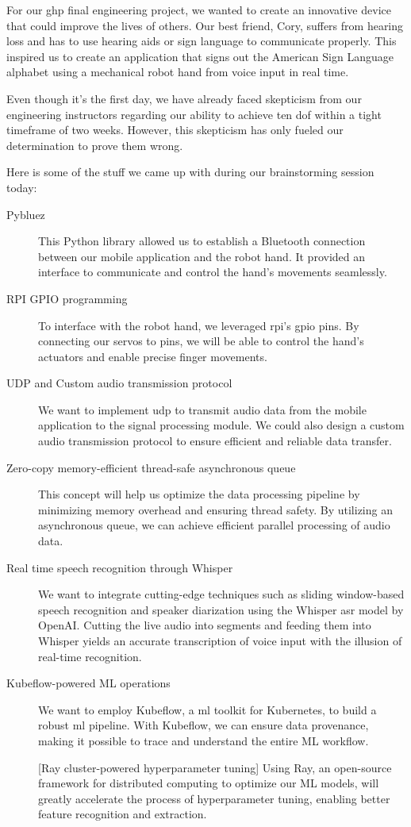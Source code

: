 
For our \gls{ghp} final engineering project, we wanted to create an innovative device that could improve the lives of others. Our best friend, Cory, suffers from hearing loss and has to use hearing aids or sign language to communicate properly. This inspired us to create an application that signs out the American Sign Language alphabet using a mechanical robot hand from voice input in real time.

Even though it's the first day, we have already faced skepticism from our engineering instructors regarding our ability to achieve ten \gls{dof} within a tight timeframe of two weeks. However, this skepticism has only fueled our determination to prove them wrong.

Here is some of the stuff we came up with during our brainstorming session today:
\begin{description}
\item[Pybluez] This Python library allowed us to establish a Bluetooth connection between our mobile application and the robot hand. It provided an interface to communicate and control the hand's movements seamlessly.

\item[RPI GPIO programming] To interface with the robot hand, we leveraged \gls{rpi}'s \gls{gpio} pins. By connecting our servos to pins, we will be able to control the hand's actuators and enable precise finger movements.

\item[UDP and Custom audio transmission protocol] We want to implement \gls{udp} to transmit audio data from the mobile application to the signal processing module. We could also design a custom audio transmission protocol to ensure efficient and reliable data transfer.

\item[Zero-copy memory-efficient thread-safe asynchronous queue] This concept will help us optimize the data processing pipeline by minimizing memory overhead and ensuring thread safety. By utilizing an asynchronous queue, we can achieve efficient parallel processing of audio data.

\item[Real time speech recognition through Whisper] We want to integrate cutting-edge techniques such as sliding window-based speech recognition and speaker diarization using the Whisper \gls{asr} model by OpenAI. Cutting the live audio into segments and feeding them into Whisper yields an accurate transcription of voice input with the illusion of real-time recognition.

\item[Kubeflow-powered ML operations] We want to employ Kubeflow, a \gls{ml} toolkit for Kubernetes, to build a robust \gls{ml} pipeline. With Kubeflow, we can ensure data provenance, making it possible to trace and understand the entire ML workflow.

[Ray cluster-powered hyperparameter tuning] Using Ray, an open-source framework for distributed computing to optimize our ML models, will greatly accelerate the process of hyperparameter tuning, enabling better feature recognition and extraction.
\end{description}
